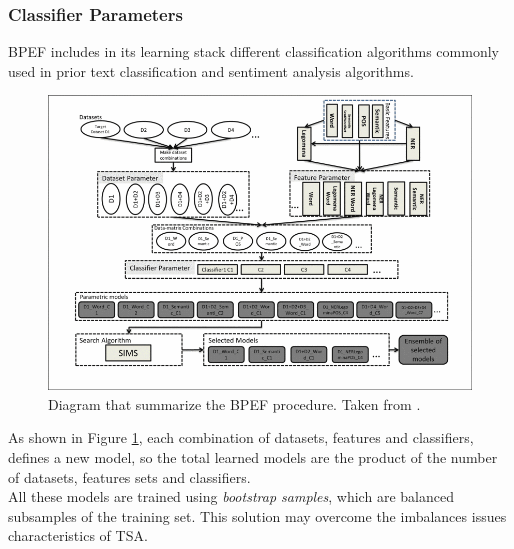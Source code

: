 \subsubsection{Classifier Parameters}

\ac{BPEF} includes in its learning stack different classification algorithms commonly used in prior text classification and sentiment analysis algorithms. \\

\begin{figure}[ht]
	\centering
	\includegraphics[width=1\textwidth]{figures/bpef.png}
	\caption{Diagram that summarize the \ac{BPEF} procedure. Taken from \cite{Hassan2013TwitterSA}.}
	\label{fig:bpef}
\end{figure}

 As shown in Figure \ref{fig:bpef}, each combination of datasets, features and classifiers, defines a new model, so the total learned models are the product of the number of datasets, features sets and classifiers.\\
 All these models are trained using \textit{bootstrap samples}, which are balanced subsamples of the training set. This solution may overcome the imbalances issues characteristics of \ac{TSA}.
 
 
